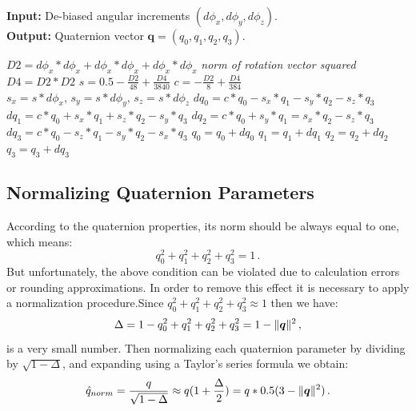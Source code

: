 \documentclass[journal]{IEEEtran}
\DeclarePairedDelimiter{\norm}{\lVert}{\rVert}
\begin{document}
\begin{algorithm}[h]
\caption{Efficient quaternion integration}
 \hspace*{\algorithmicindent} \textbf{Input:} De-biased angular increments $({d\phi}_x,{d\phi}_y,{d\phi}_z)$. \\
 \hspace*{\algorithmicindent} \textbf{Output:} Quaternion vector $\boldsymbol{q}=(q_0,q_1,q_2,q_3)$. 
\begin{algorithmic}[1]
\State $D2 = {d\phi}_x *{d\phi}_x + {d\phi}_x *{d\phi}_x+{d\phi}_x *{d\phi}_x$ \Comment \textit{norm of rotation vector squared}
\State $D4=D2*D2$
\State $s = 0.5 - \frac{D2}{48} + \frac{D4}{3840} $
\State $c= - \frac{D2}{8} + \frac{D4}{384} $
\State $s_x = s *{d\phi}_x, \,s_y = s *{d\phi}_y,\, s_z = s *{d\phi}_z $
\State ${dq_0}=c *q_0 -s_x *q_1-s_y *q_2-s_z *q_3  $
\State ${dq_1}=c *q_0 +s_x *q_1+s_z *q_2-s_y *q_3  $
\State ${dq_2}=c *q_0 +s_y *q_1=s_x *q_2-s_z *q_3  $
\State ${dq_3}=c *q_0 -s_z *q_1-s_y *q_2-s_x *q_3  $
\State $q_0 =  q_0 +dq_0$
\State $q_1 =  q_1 +dq_1$
\State $q_2 =  q_2 +dq_2$
\State $q_3 =  q_3 +dq_3$
\end{algorithmic}
\label{qint}
\end{algorithm}



%
\subsection{Normalizing Quaternion Parameters}
According to the quaternion properties, its norm should be always equal to one, which means:
\begin{equation}
    q_0^2+q_1^2+q_2^2+q_3^2= 1\,.
\end{equation}
But unfortunately, the above condition can be violated due to calculation errors or rounding approximations. In order to remove this effect it is necessary to apply a normalization procedure.Since $ q_0^2+q_1^2+q_2^2+q_3^2\approx 1$ then we have:
\begin{equation}
    \Delta =1 - q_0^2+q_1^2+q_2^2+q_3^2=1-\norm{\boldsymbol{q}}^2\,,
\end{equation}
is a very small number. Then normalizing each quaternion parameter by dividing by $\sqrt{1-\Delta}$, and expanding using a Taylor's series formula we obtain:
\begin{equation}
    \hat{q}_{norm}= \frac{q}{\sqrt{1-\Delta}}\approx q(1+\frac{\Delta}{2})=q*0.5(3-\norm{\boldsymbol{q}}^2)\,.
\end{equation}
\end{document}
